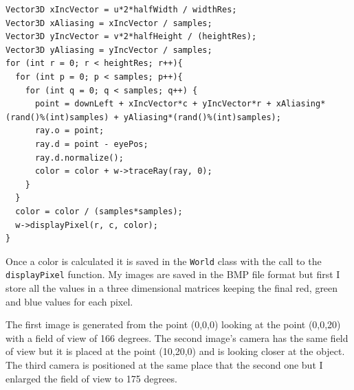 \documentclass[a4paper,11.5pt]{article}
\theoremstyle{mytheor}
\begin{document}
\begin{lstlisting}
Vector3D xIncVector = u*2*halfWidth / widthRes;
Vector3D xAliasing = xIncVector / samples;
Vector3D yIncVector = v*2*halfHeight / (heightRes);
Vector3D yAliasing = yIncVector / samples;
for (int r = 0; r < heightRes; r++){
  for (int p = 0; p < samples; p++){
    for (int q = 0; q < samples; q++) {
      point = downLeft + xIncVector*c + yIncVector*r + xAliasing*(rand()%(int)samples) + yAliasing*(rand()%(int)samples);
      ray.o = point;
      ray.d = point - eyePos;
      ray.d.normalize();
      color = color + w->traceRay(ray, 0);
    }
  }
  color = color / (samples*samples);
  w->displayPixel(r, c, color);
}
\end{lstlisting}
Once a color is calculated it is saved in the \texttt{World} class with the call to the \texttt{displayPixel} function. My images are saved in the BMP file format but first I store all the values in a three dimensional matrices keeping the final red, green and blue values for each pixel. 
\begin{figure}[H]
\centering
{}
\end{figure}
The first image is generated from the point (0,0,0) looking at the point (0,0,20) with a field of view of 166 degrees. The second image's camera has the same field of view but it is placed at the point (10,20,0) and is looking closer at the object. The third camera is positioned at the same place that the second one but I enlarged the field of view to 175 degrees.
\end{document}
